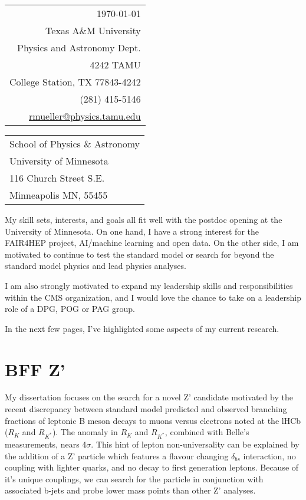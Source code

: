 \documentclass[11pt]{article}
\begin{document}
\hfill%
\begin{tabular}{@{}r@{}}
  \today \\
  [.5em]
Texas A\&M University \\
Physics and Astronomy Dept. \\
4242 TAMU \\
College Station, TX 77843-4242 \\
[.5em]
(281) 415-5146 \\
\href{mailto:rmueller@physics.tamu.edu}{rmueller@physics.tamu.edu}\\
\end{tabular}



\bigskip


\begin{tabular}{@{}l@{}}
School of Physics \& Astronomy \\
 University of Minnesota \\
116 Church Street S.E. \\
Minneapolis MN, 55455
\end{tabular}

\bigskip

My skill sets, interests, and goals all fit well with the postdoc opening at the University of Minnesota. On one hand, I have a strong interest for the FAIR4HEP project, AI/machine learning and open data. On the other side, I am motivated to continue to test the standard model or search for beyond the standard model physics and lead  physics analyses. 

I am also strongly motivated to expand my leadership skills and responsibilities within the CMS organization, and I would love the chance to take on a leadership role of a DPG, POG or PAG group.


In the next few pages, I've highlighted some aspects of my current research. 

\section{BFF Z'}

My dissertation focuses on the search for a novel Z' candidate motivated by the recent discrepancy between standard model predicted and observed branching fractions of leptonic B meson decays to muons versus electrons noted at the lHCb ($R_K$ and $R_{K^{*}}$). The anomaly in $R_K$ and $R_{K^{*}}$, combined with Belle's measurements, nears 4$\sigma$\cite{rkStar}. This hint of lepton non-universality can be explained by the addition of a Z' particle which features a flavour changing $\delta_{bs}$ interaction, no coupling with lighter quarks, and no decay to first generation leptons. Because of it's unique couplings, we can search for the particle in conjunction with associated b-jets and probe lower mass points than other Z' analyses. 
\end{document}
